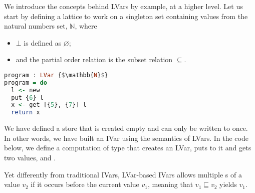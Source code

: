 \documentclass[main.tex]{subfiles}
\begin{document}
We introduce the concepts behind LVars by example, at a higher level. Let us start by defining a lattice to work on a singleton set containing values from the natural numbers set, $\mathbb{N}$, where
\begin{itemize}
\item $\bot$ is defined as $\varnothing$;
\item and the partial order relation is the subset relation $\subseteq$.
\end{itemize}

\begin{lstlisting}[language=Haskell]
program : LVar {$\mathbb{N}$}
program = do
  l <- new
  put {6} l
  x <- get [{5}, {7}] l
  return x
\end{lstlisting}

We have defined a store that is created empty and can only be written to once. In other words, we have built an IVar using the semantics of LVars. In the code below, we define a computation  of type  that creates an LVar, puts  to it and gets two values,  and .

Yet differently from traditional IVars, LVar-based IVars allows multiple s of a value $v_2$ if it occurs before the current value $v_1$, meaning that $v_1 \sqsubseteq v_2$ yields $v_1$.
\end{document}
